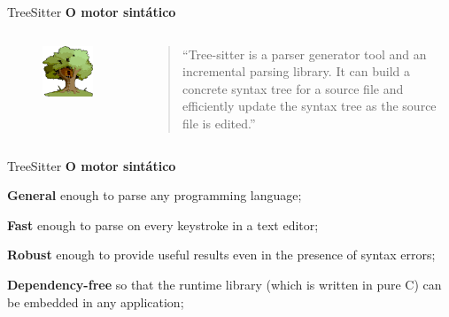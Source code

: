 \begin{frame}{TreeSitter}
  \textbf{O motor sintático}
    \begin{columns}
      \begin{column}{0.3\textwidth}
        \begin{figure}
            \centering
            \includegraphics[height=0.7\linewidth]{Image/TreeSitterLogo.png}
            \label{treesitter-logo}
        \end{figure}
      \end{column}

      \begin{column}{0.7\textwidth}
        \begin{widedescription}
          \item \begin{quotation} \small
            ``Tree-sitter is a parser generator tool and an incremental parsing library. It can build a
            concrete syntax tree for a source file and efficiently update the syntax tree as the source file is
            edited.''
          \end{quotation}
        \end{widedescription}
      \end{column}
  \end{columns}
\end{frame}

\begin{frame}{TreeSitter}
  \textbf{O motor sintático}
    \begin{widedescription}
      \item \textbf{General} enough to parse any programming language;
      \item \textbf{Fast} enough to parse on every keystroke in a text editor;
      \item \textbf{Robust} enough to provide useful results even in the presence of syntax errors;
      \item \textbf{Dependency-free} so that the runtime library (which is written in pure C) can be embedded in any application;
    \end{widedescription}
\end{frame}

